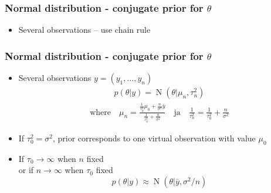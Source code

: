 \documentclass[english,t]{beamer}
\DeclareMathOperator{\N}{N}
\begin{document}
\begin{frame}
  \frametitle{Normal distribution - conjugate prior for $\theta$}

  \begin{itemize}
  \item Several observations -- use chain rule
  \end{itemize}

\end{frame}

\begin{frame}

  \frametitle{Normal distribution - conjugate prior for $\theta$}

  \begin{itemize}
  \item Several observations $y=(y_1,\ldots,y_n)$
    \begin{align*}
      p(\theta|y) = \N(\theta|\mu_n,\tau_n^2)
    \end{align*}
    \vskip -6mm
    \begin{align*}
      \text{where} \quad
      \mu_n=\frac{\frac{1}{\tau_0^2}\mu_0+\frac{n}{\sigma^2}\bar{y}}{\frac{1}{\tau_0^2}+\frac{n}{\sigma^2}} \quad
      \text{ja} \quad \frac{1}{\tau_n^2} = \frac{1}{\tau_0^2}+\frac{n}{\sigma^2}
    \end{align*}
  \item If $\tau_0^2=\sigma^2$, prior corresponds to one virtual observation with value $\mu_0$
    \pause
    \item If $\tau_0\rightarrow\infty$ when $n$ fixed\\
      or if $n\rightarrow\infty$ when $\tau_0$ fixed
      \begin{equation*}
        p(\theta|y) \approx \N(\theta|\bar{y},\sigma^2/n)
      \end{equation*}
  \end{itemize}

\end{frame}


\end{document}
